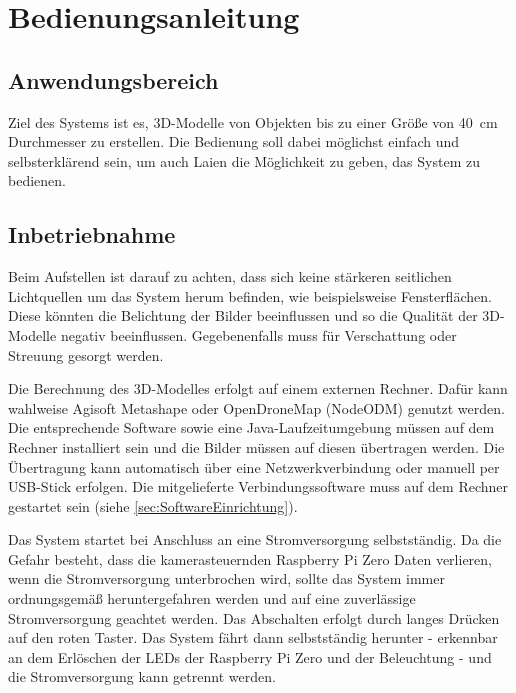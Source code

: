 \documentclass[./00PhotoBox.tex]{subfiles}
\begin{document}
\chapter{Bedienungsanleitung}
\label{ch:Bedienungsanleitung}


\section{Anwendungsbereich}
Ziel des Systems ist es, 3D-Modelle von Objekten bis zu einer Größe von \SI{40}{\centi\metre} Durchmesser zu erstellen. Die Bedienung soll dabei möglichst einfach und selbsterklärend sein, um auch Laien die Möglichkeit zu geben, das System zu bedienen.

\section{Inbetriebnahme}
Beim Aufstellen ist darauf zu achten, dass sich keine stärkeren seitlichen Lichtquellen um das System herum befinden, wie beispielsweise Fensterflächen. Diese könnten die Belichtung der Bilder beeinflussen und so die Qualität der 3D-Modelle negativ beeinflussen. Gegebenenfalls muss für Verschattung oder Streuung gesorgt werden. 

Die Berechnung des 3D-Modelles erfolgt auf einem externen Rechner. Dafür kann wahlweise Agisoft Metashape oder OpenDroneMap (NodeODM) genutzt werden. Die entsprechende Software sowie eine Java-Laufzeitumgebung müssen auf dem Rechner installiert sein und die Bilder müssen auf diesen übertragen werden. Die Übertragung kann automatisch über eine Netzwerkverbindung oder manuell per USB-Stick erfolgen. Die mitgelieferte Verbindungssoftware muss auf dem Rechner gestartet sein (siehe \autoref{sec:SoftwareEinrichtung}).

Das System startet bei Anschluss an eine Stromversorgung selbstständig. Da die Gefahr besteht, dass die kamerasteuernden Raspberry Pi Zero Daten verlieren, wenn die Stromversorgung unterbrochen wird, sollte das System immer ordnungsgemäß heruntergefahren werden und auf eine zuverlässige Stromversorgung geachtet werden.
Das Abschalten erfolgt durch langes Drücken auf den roten Taster. Das System fährt dann selbstständig herunter - erkennbar an dem Erlöschen der LEDs der Raspberry Pi Zero und der Beleuchtung - und die Stromversorgung kann getrennt werden.
\end{document}
